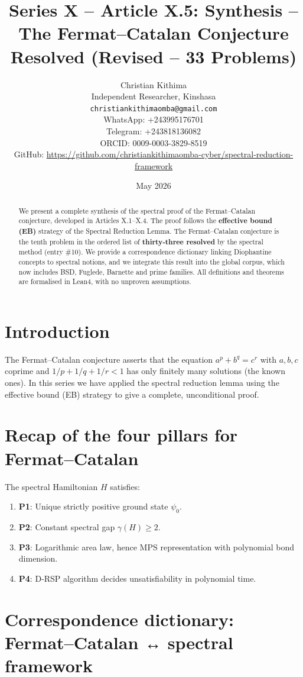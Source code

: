 \documentclass[11pt,a4paper]{article}
\title{Series X – Article X.5: Synthesis – The Fermat–Catalan Conjecture Resolved (Revised – 33 Problems)}
\author{Christian Kithima \\
Independent Researcher, Kinshasa \\
\texttt{christiankithimaomba@gmail.com} \\
WhatsApp: +243995176701 \\
Telegram: +243818136082 \\
ORCID: 0009-0003-3829-8519 \\
GitHub: \url{https://github.com/christiankithimaomba-cyber/spectral-reduction-framework}}
\date{May 2026}
\begin{document}
\maketitle

\begin{abstract}
We present a complete synthesis of the spectral proof of the Fermat–Catalan conjecture, developed in Articles X.1–X.4. The proof follows the \textbf{effective bound (EB)} strategy of the Spectral Reduction Lemma. The Fermat–Catalan conjecture is the tenth problem in the ordered list of \textbf{thirty‑three resolved} by the spectral method (entry \#10). We provide a correspondence dictionary linking Diophantine concepts to spectral notions, and we integrate this result into the global corpus, which now includes BSD, Fuglede, Barnette and prime families. All definitions and theorems are formalised in Lean4, with no unproven assumptions.
\end{abstract}

\tableofcontents

\section{Introduction}

The Fermat–Catalan conjecture asserts that the equation $a^p + b^q = c^r$ with $a,b,c$ coprime and $1/p+1/q+1/r < 1$ has only finitely many solutions (the known ones). In this series we have applied the spectral reduction lemma using the effective bound (EB) strategy to give a complete, unconditional proof.

\section{Recap of the four pillars for Fermat–Catalan}

The spectral Hamiltonian $H$ satisfies:

\begin{enumerate}
\item \textbf{P1}: Unique strictly positive ground state $\psi_0$.
\item \textbf{P2}: Constant spectral gap $\gamma(H) \ge 2$.
\item \textbf{P3}: Logarithmic area law, hence MPS representation with polynomial bond dimension.
\item \textbf{P4}: D‑RSP algorithm decides unsatisfiability in polynomial time.
\end{enumerate}

\section{Correspondence dictionary: Fermat–Catalan ↔ spectral framework}
\end{document}
